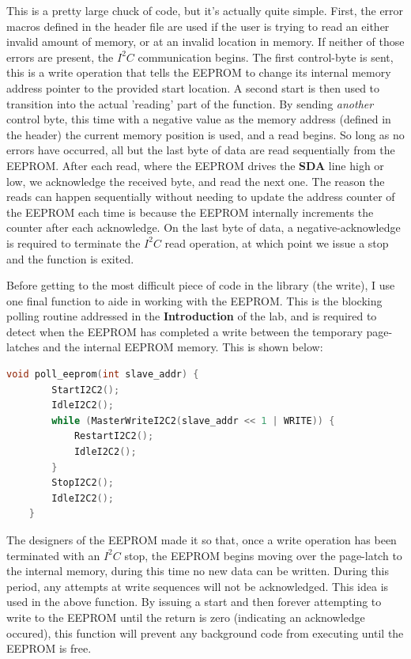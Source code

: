 \documentclass[a4paper, 12pt]{article}
\begin{document}
This is a pretty large chuck of code, but it's actually quite simple. First, the error macros defined in the header file are used if the user is trying to read an either invalid amount of memory, or at an invalid location in memory. If neither of those errors are present, the $I^2C$ communication begins. The first control-byte is sent, this is a write operation that tells the EEPROM to change its internal memory address pointer to the provided start location. A second start is then used to transition into the actual 'reading' part of the function. By sending \textit{another} control byte, this time with a negative value as the memory address (defined in the header) the current memory position is used, and a read begins. So long as no errors have occurred, all but the last byte of data are read sequentially from the EEPROM. After each read, where the EEPROM drives the \textbf{SDA} line high or low, we acknowledge the received byte, and read the next one. The reason the reads can happen sequentially without needing to update the address counter of the EEPROM each time is because the EEPROM internally increments the counter after each acknowledge. On the last byte of data, a negative-acknowledge is required to terminate the $I^2C$ read operation, at which point we issue a stop and the function is exited.

Before getting to the most difficult piece of code in the library (the write), I use one final function to aide in working with the EEPROM. This is the blocking polling routine addressed in the \textbf{Introduction} of the lab, and is required to detect when the EEPROM has completed a write between the temporary page-latches and the internal EEPROM memory. This is shown below:

	\begin{mdframed}[backgroundcolor=code-gray, roundcorner=10pt,
								innerleftmargin=5, innertopmargin=5, innerbottommargin=5]	
	\begin{lstlisting}[language=C, caption=EEPROM Polling Routine, tabsize=2]
	void poll_eeprom(int slave_addr) {
		StartI2C2();
		IdleI2C2();
		while (MasterWriteI2C2(slave_addr << 1 | WRITE)) {
			RestartI2C2();
			IdleI2C2();
		}
		StopI2C2();
		IdleI2C2();
	}
	\end{lstlisting}
	\end{mdframed}
	
The designers of the EEPROM made it so that, once a write operation has been terminated with an $I^2C$ stop, the EEPROM begins moving over the page-latch to the internal memory, during this time no new data can be written. During this period, any attempts at write sequences will not be acknowledged. This idea is used in the above function. By issuing a start and then forever attempting to write to the EEPROM until the return is zero (indicating an acknowledge occured), this function will prevent any background code from executing until the EEPROM is free.
\end{document}
